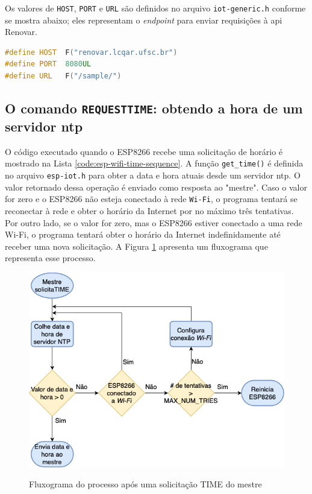 Os valores de \texttt{HOST}, \texttt{PORT} e \texttt{URL} são definidos no arquivo \texttt{iot-generic.h} conforme se mostra abaixo; eles representam o \textit{endpoint} para enviar requisições à \acrshort*{api} Renovar.

\begin{lstlisting}[language=C++]
#define HOST  F("renovar.lcqar.ufsc.br")
#define PORT  8080UL
#define URL   F("/sample/")
\end{lstlisting}

\subsection*{O comando \texttt{REQUESTTIME}: obtendo a hora de um servidor \acrshort*{ntp}}

O código executado quando o ESP8266 recebe uma solicitação de horário é mostrado na Lista \ref*{code:esp-wifi-time-sequence}. A função \texttt{get\_time()} é definida no arquivo \texttt{esp-iot.h} para obter a data e hora atuais desde um servidor 
\acrshort{ntp}. O valor retornado dessa operação é enviado como resposta ao "mestre". Caso o valor for zero e o ESP8266 não esteja conectado à rede \texttt{Wi-Fi}, o programa tentará se reconectar à rede e obter o horário da Internet por no máximo três tentativas. Por outro lado, se o valor for zero, mas o ESP8266 estiver conectado a uma rede Wi-Fi, o programa tentará obter o horário da Internet indefinidamente até receber uma nova solicitação. A Figura \ref*{fig:fw-esp-time-sequence} apresenta um fluxograma que representa esse processo.

\begin{figure}[h]
    \centering
    \caption{Fluxograma do processo após uma solicitação TIME do mestre}
    \includegraphics[width=0.75\linewidth]{aftertext//Firmware ESP8266/Figuras/ESP8266 TIME sequence(PT).png}
    \label{fig:fw-esp-time-sequence}
\end{figure}

